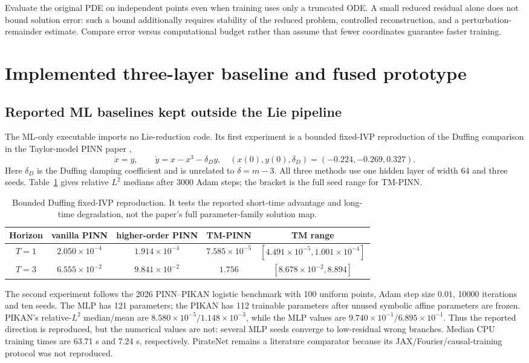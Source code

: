 \documentclass[11pt]{article}
\begin{document}
Evaluate the original PDE on independent points even when training uses
only a truncated ODE. A small reduced residual alone does not bound solution
error: such a bound additionally requires stability of the reduced problem,
controlled reconstruction, and a perturbation-remainder estimate.
Compare error versus computational budget rather than assume that fewer
coordinates guarantee faster training.

\section{Implemented three-layer baseline and fused prototype}
\subsection{Reported ML baselines kept outside the Lie pipeline}
The ML-only executable imports no Lie-reduction code.  Its first experiment is
a bounded fixed-IVP reproduction of the Duffing comparison in the Taylor-model
PINN paper \cite{tmpinn},
\[
 \dot x=y,\qquad \dot y=x-x^3-\delta_Dy,
 \quad (x(0),y(0),\delta_D)=(-0.224,-0.269,0.327).
\]
Here $\delta_D$ is the Duffing damping coefficient and is unrelated to
$\delta=m-3$. All three methods use one hidden layer of width 64 and three
seeds. Table~\ref{tab:duffing} gives relative $L^2$ medians after 3000 Adam
steps; the bracket is the full seed range for TM-PINN.
\begin{table}[htbp]
\centering\small
\begin{tabular}{@{}ccccc@{}}
\toprule
Horizon & vanilla PINN & higher-order PINN & TM-PINN & TM range \\
\midrule
$T=1$ & $2.050\times10^{-4}$ & $1.914\times10^{-4}$ & $7.585\times10^{-5}$
 & $[4.491\times10^{-5},1.001\times10^{-4}]$ \\
$T=3$ & $6.555\times10^{-2}$ & $9.841\times10^{-2}$ & $1.756$
 & $[8.678\times10^{-2},8.894]$ \\
\bottomrule
\end{tabular}
\caption{Bounded Duffing fixed-IVP reproduction. It tests the reported
short-time advantage and long-time degradation, not the paper's full
parameter-family solution map.}
\label{tab:duffing}
\end{table}

The second experiment follows the 2026 PINN--PIKAN logistic benchmark
\cite{pikan} with 100 uniform points, Adam step size $0.01$, 10000 iterations
and ten seeds. The MLP has 121 parameters; the PIKAN has 112 trainable
parameters after unused symbolic affine parameters are frozen. PIKAN's
relative-$L^2$ median/mean are $8.580\times10^{-5}/1.148\times10^{-3}$, while the
MLP values are $9.740\times10^{-1}/6.895\times10^{-1}$. Thus the reported direction
is reproduced, but the numerical values are not: several MLP seeds converge
to low-residual wrong branches. Median CPU training times are 63.71 s and
7.24 s, respectively. PirateNet \cite{piratenet} remains a literature
comparator because its JAX/Fourier/causal-training protocol was not reproduced.
\end{document}
